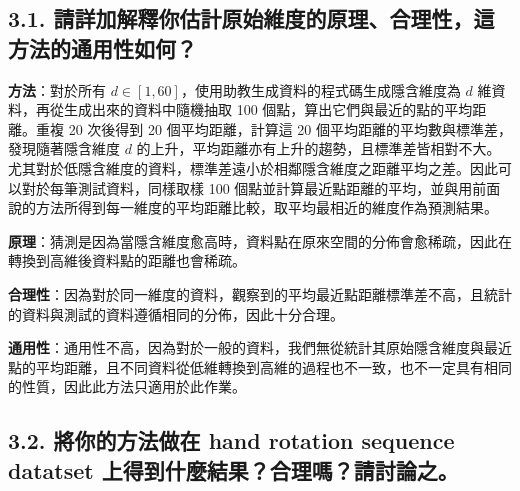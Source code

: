 \documentclass[fleqn,a4paper,12pt]{article}
\begin{document}
\subsection*{3.1. 請詳加解釋你估計原始維度的原理、合理性，這方法的通用性如何？}

\par
\textbf{方法}：對於所有 $d \in [1, 60]$，使用助教生成資料的程式碼生成隱含維度為 $d$ 維資料，再從生成出來的資料中隨機抽取 100 個點，算出它們與最近的點的平均距離。重複 20 次後得到 20 個平均距離，計算這 20 個平均距離的平均數與標準差，發現隨著隱含維度 $d$ 的上升，平均距離亦有上升的趨勢，且標準差皆相對不大。尤其對於低隱含維度的資料，標準差遠小於相鄰隱含維度之距離平均之差。因此可以對於每筆測試資料，同樣取樣 100 個點並計算最近點距離的平均，並與用前面說的方法所得到每一維度的平均距離比較，取平均最相近的維度作為預測結果。

\textbf{原理}：猜測是因為當隱含維度愈高時，資料點在原來空間的分佈會愈稀疏，因此在轉換到高維後資料點的距離也會稀疏。

\textbf{合理性}：因為對於同一維度的資料，觀察到的平均最近點距離標準差不高，且統計的資料與測試的資料遵循相同的分佈，因此十分合理。

\textbf{通用性}：通用性不高，因為對於一般的資料，我們無從統計其原始隱含維度與最近點的平均距離，且不同資料從低維轉換到高維的過程也不一致，也不一定具有相同的性質，因此此方法只適用於此作業。

\subsection*{3.2. 將你的方法做在 hand rotation sequence datatset 上得到什麼結果？合理嗎？請討論之。}
\end{document}
